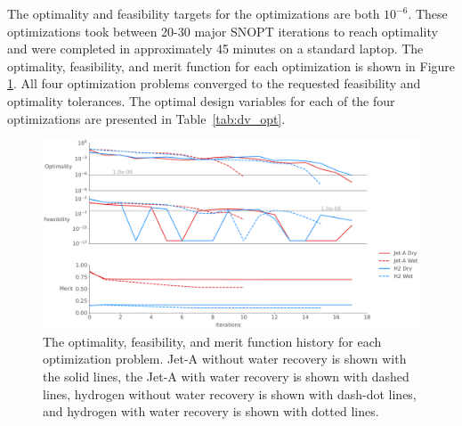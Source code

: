 \documentclass[conf]{new-aiaa}
\begin{document}
The optimality and feasibility targets for the optimizations are both $10^{-6}$.
These optimizations took between 20-30 major SNOPT iterations to reach optimality and were completed in approximately 45 minutes on a standard laptop.
The optimality, feasibility, and merit function for each optimization is shown in Figure \ref{fig:history_summary}.
All four optimization problems converged to the requested feasibility and optimality tolerances.
The optimal design variables for each of the four optimizations are presented in Table~\ref{tab:dv_opt}.

\begin{figure}[hbt!]
    \centering
    \includegraphics[width=1.0\textwidth]{opt_summary.pdf}
    \caption{The optimality, feasibility, and merit function history for each optimization problem.
        Jet-A without water recovery is shown with the solid lines, the Jet-A with water recovery is shown with dashed lines, hydrogen without water recovery is shown with dash-dot lines, and hydrogen with water recovery is shown with dotted lines.}
    \label{fig:history_summary}
\end{figure}
\end{document}
